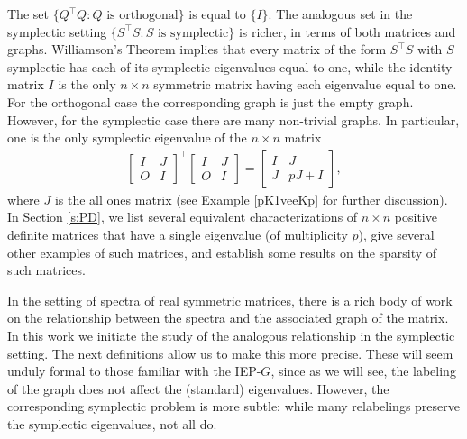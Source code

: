 \documentclass[12pt]{article}
\theoremstyle{definition}
\theoremstyle{definition}
\theoremstyle{definition}
\numberwithin{figure}{section}
\numberwithin{equation}{section}
\newcommand{\trans}{^{\top}}
\newcommand{\mtx}[1]{\begin{bmatrix} #1 \end{bmatrix}}
\begin{document}
The set $\{Q\trans Q\colon Q \text{ is orthogonal}\}$ is equal to $\{I\}$. The analogous set in the symplectic setting  $\{S\trans S\colon S \text{ is symplectic}\}$ is richer, in terms of both matrices and graphs.  Williamson's Theorem implies that 
every matrix of the form $S\trans S$ with $S$  symplectic has each of its symplectic eigenvalues equal to one,  
while the identity matrix
$I$ is the  
only $n\times n$ symmetric matrix having each eigenvalue equal to one.
For the orthogonal case the corresponding graph is just the empty graph. However, for the symplectic case there are many non-trivial graphs. 
In particular, one is the only symplectic eigenvalue of the $n \times n$ matrix 
\begin{align}
\label{spec_arb_ex}
\mtx{ I & J \\
      O & I
}^\top \mtx{ I & J \\
     O & I}
      = \mtx{I & J \\ J &  pJ+I},
\end{align}
 where $J$ is the all ones matrix (see Example \ref{pK1veeKp} for further discussion).  In Section \ref{s:PD}, we list  several equivalent characterizations of $n\times n$ positive definite matrices that have a single eigenvalue (of multiplicity $p$), give several other  examples of such matrices, and establish some results on the sparsity of such matrices. 

In the setting of spectra of real symmetric matrices, there is a rich body of work on the relationship 
between the spectra and the associated graph of the matrix. In  this work 
we initiate the study of the analogous 
relationship in the symplectic setting. The next definitions allow us to make this more precise. 
 These will seem unduly formal to those familiar with the IEP-$G$, since as we will see, the  labeling of the graph does not affect the (standard) eigenvalues.  However, the corresponding symplectic problem is more subtle: while many relabelings preserve the symplectic eigenvalues, not all do. 
 
\end{document}
